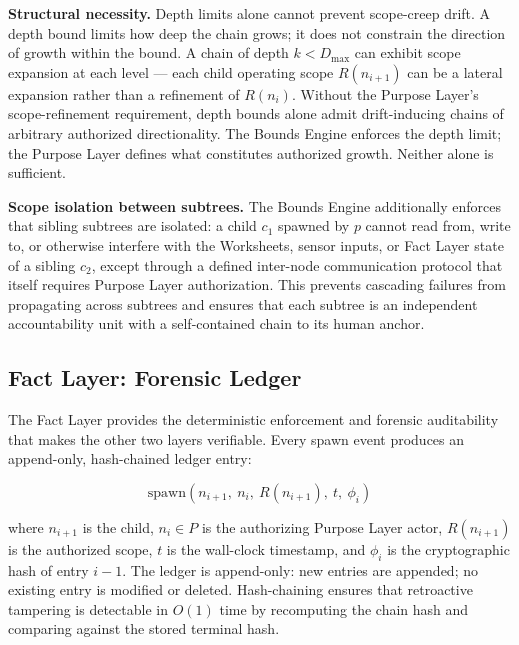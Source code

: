 \medskip
\noindent\textbf{Structural necessity.} Depth limits alone cannot prevent scope-creep drift. A depth bound limits how deep the chain grows; it does not constrain the direction of growth within the bound. A chain of depth $k < D_{\mathrm{max}}$ can exhibit scope expansion at each level — each child operating scope $R(n_{i+1})$ can be a lateral expansion rather than a refinement of $R(n_i)$. Without the Purpose Layer's scope-refinement requirement, depth bounds alone admit drift-inducing chains of arbitrary authorized directionality. The Bounds Engine enforces the depth limit; the Purpose Layer defines what constitutes authorized growth. Neither alone is sufficient.

\medskip
\noindent\textbf{Scope isolation between subtrees.} The Bounds Engine additionally enforces that sibling subtrees are isolated: a child $c_1$ spawned by $p$ cannot read from, write to, or otherwise interfere with the Worksheets, sensor inputs, or Fact Layer state of a sibling $c_2$, except through a defined inter-node communication protocol that itself requires Purpose Layer authorization. This prevents cascading failures from propagating across subtrees and ensures that each subtree is an independent accountability unit with a self-contained chain to its human anchor.

\subsection{Fact Layer: Forensic Ledger}
\label{sec:rs-fact-ledger}

The Fact Layer provides the deterministic enforcement and forensic auditability that makes the other two layers verifiable. Every spawn event produces an append-only, hash-chained ledger entry:

\begin{equation}
\text{spawn}(n_{i+1},\ n_i,\ R(n_{i+1}),\ t,\ \phi_i)
\tag{4}
\end{equation}

where $n_{i+1}$ is the child, $n_i \in P$ is the authorizing Purpose Layer actor, $R(n_{i+1})$ is the authorized scope, $t$ is the wall-clock timestamp, and $\phi_i$ is the cryptographic hash of entry $i-1$. The ledger is append-only: new entries are appended; no existing entry is modified or deleted. Hash-chaining ensures that retroactive tampering is detectable in $O(1)$ time by recomputing the chain hash and comparing against the stored terminal hash.

